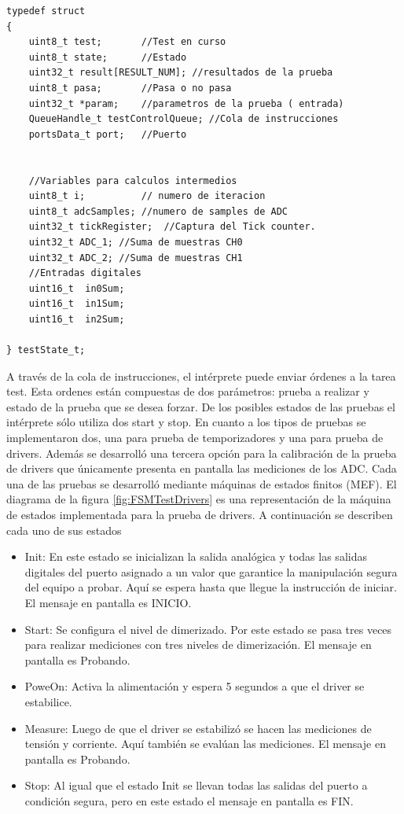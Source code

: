 \begin{lstlisting}[label=cod:estTestState, caption= Estructura de estado del test.]
typedef struct
{
	uint8_t test; 		//Test en curso
	uint8_t state; 		//Estado
	uint32_t result[RESULT_NUM]; //resultados de la prueba
	uint8_t pasa; 		//Pasa o no pasa
	uint32_t *param;	//parametros de la prueba ( entrada)
	QueueHandle_t testControlQueue; //Cola de instrucciones
	portsData_t port;	//Puerto


	//Variables para calculos intermedios
	uint8_t i;			// numero de iteracion
	uint8_t adcSamples; //numero de samples de ADC
	uint32_t tickRegister;	//Captura del Tick counter.
	uint32_t ADC_1; //Suma de muestras CH0
	uint32_t ADC_2; //Suma de muestras CH1
	//Entradas digitales
	uint16_t  in0Sum; 
	uint16_t  in1Sum;
	uint16_t  in2Sum;

} testState_t;
\end{lstlisting}

A través de la cola de instrucciones, el intérprete puede enviar órdenes a la tarea test. Esta ordenes están compuestas de dos parámetros: prueba a realizar y estado de la prueba que se desea forzar. De los posibles estados de las pruebas el intérprete sólo utiliza dos start y stop.
En cuanto a los tipos de pruebas se implementaron dos, una para prueba de temporizadores y una para prueba de drivers. Además se desarrolló una tercera opción para la calibración de la prueba de drivers que únicamente presenta en pantalla las mediciones de los ADC.
Cada una de las pruebas se desarrolló mediante máquinas de estados finitos (MEF). 
El diagrama de la figura \ref{fig:FSMTestDrivers} es una representación de la máquina de estados implementada para la prueba de drivers. A continuación se describen cada uno de sus estados
\begin{itemize}
	\item Init: En este estado se inicializan la salida analógica y todas las salidas digitales del puerto asignado a un valor que garantice la manipulación segura del equipo  a probar. Aquí se espera hasta que llegue la instrucción de iniciar. El mensaje en pantalla es INICIO.
	\item Start: Se configura el nivel de dimerizado. Por este estado se pasa tres veces para realizar mediciones con tres niveles de dimerización. El mensaje en pantalla es Probando.
	\item PoweOn: Activa la alimentación y espera 5 segundos a que el driver se estabilice.
	\item Measure: Luego de que el driver se estabilizó se hacen las mediciones de tensión y corriente. Aquí también se evalúan las mediciones. El mensaje en pantalla es Probando.
	\item Stop: Al igual que el estado Init se llevan todas las salidas del puerto a condición segura, pero en este estado el mensaje en pantalla es FIN.
\end{itemize}
	

